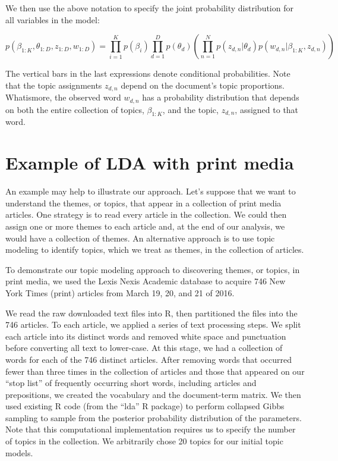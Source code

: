 \documentclass[12pt,]{article}
\begin{document}
We then use the above notation to specify the joint probability
distribution for all variables in the model:

\[p(\beta_{1:K}, \theta_{1:D}, z_{1:D}, w_{1:D}) = \prod_{i = 1}^Kp(\beta_i)\prod_{d = 1}^Dp(\theta_d)\left( \prod_{n = 1}^N p(z_{d,n}|\theta_d)p(w_{d,n}|\beta_{1:K}, z_{d,n})\right)\]

The vertical bars in the last expressions denote conditional
probabilities. Note that the topic assignments \(z_{d,n}\) depend on the
document's topic proportions. Whatismore, the observed word \(w_{d,n}\)
has a probability distribution that depends on both the entire
collection of topics, \(\beta_{1:K}\), and the topic, \(z_{d,n}\),
assigned to that word.

\section{Example of LDA with print
media}\label{example-of-lda-with-print-media}

An example may help to illustrate our approach. Let's suppose that we
want to understand the themes, or topics, that appear in a collection of
print media articles. One strategy is to read every article in the
collection. We could then assign one or more themes to each article and,
at the end of our analysis, we would have a collection of themes. An
alternative approach is to use topic modeling to identify topics, which
we treat as themes, in the collection of articles.

To demonstrate our topic modeling approach to discovering themes, or
topics, in print media, we used the Lexis Nexis Academic database to
acquire 746 New York Times (print) articles from March 19, 20, and 21 of
2016.

We read the raw downloaded text files into R, then partitioned the files
into the 746 articles. To each article, we applied a series of text
processing steps. We split each article into its distinct words and
removed white space and punctuation before converting all text to
lower-case. At this stage, we had a collection of words for each of the
746 distinct articles. After removing words that occurred fewer than
three times in the collection of articles and those that appeared on our
``stop list'' of frequently occurring short words, including articles
and prepositions, we created the vocabulary and the document-term
matrix. We then used existing R code (from the ``lda'' R package) to
perform collapsed Gibbs sampling to sample from the posterior
probability distribution of the parameters. Note that this computational
implementation requires us to specify the number of topics in the
collection. We arbitrarily chose 20 topics for our initial topic models.
\end{document}
